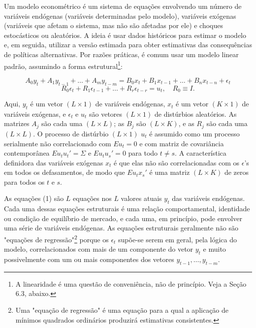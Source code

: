 \documentclass[12pt]{article}
\begin{document}
Um modelo econométrico é um sistema de equações envolvendo um número de variáveis endógenas (variáveis determinadas pelo modelo), variáveis exógenas (variáveis que afetam o sistema, mas não são afetadas por ele) e choques estocásticos ou aleatórios. A ideia é usar dados históricos para estimar o modelo e, em seguida, utilizar a versão estimada para obter estimativas das consequências de políticas alternativas. Por razões práticas, é comum usar um modelo linear padrão, assumindo a forma estrutural\footnote{A linearidade é uma questão de conveniência, não de princípio. Veja a Seção 6.3, abaixo.}:

\begin{equation}
A_0 y_t + A_1 y_{t-1} + \dots + A_m y_{t-m} = B_0 x_t + B_1 x_{t-1} + \dots + B_n x_{t-n} + \epsilon_t
\end{equation}
\begin{equation}
R_0 \epsilon_t + R_1 \epsilon_{t-1} + \dots + R_r \epsilon_{t-r} = u_t, \quad R_0 \equiv I.
\end{equation}

Aqui, $y_t$ é um vetor $(L \times 1)$ de variáveis endógenas, $x_t$ é um vetor $(K \times 1)$ de variáveis exógenas, e $\epsilon_t$ e $u_t$ são vetores $(L \times 1)$ de distúrbios aleatórios. As matrizes $A_j$ são cada uma $(L \times L)$; as $B_j$ são $(L \times K)$, e as $R_j$ são cada uma $(L \times L)$. O processo de distúrbio $(L \times 1)$ $u_t$ é assumido como um processo serialmente não correlacionado com $E u_t = 0$ e com matriz de covariância contemporânea $E u_t u_t' = \Sigma$ e $E u_t u_s' = 0$ para todo $t \neq s$. A característica definidora das variáveis exógenas $x_t$ é que elas não são correlacionadas com os $\epsilon$'s em todos os defasamentos, de modo que $E u_t x_s'$ é uma matriz $(L \times K)$ de zeros para todos os $t$ e $s$.

As equações (1) são $L$ equações nos $L$ valores atuais $y_t$ das variáveis endógenas. Cada uma dessas equações estruturais é uma relação comportamental, identidade ou condição de equilíbrio de mercado, e cada uma, em princípio, pode envolver uma série de variáveis endógenas. As equações estruturais geralmente não são "equações de regressão"\footnote{Uma "equação de regressão" é uma equação para a qual a aplicação de mínimos quadrados ordinários produzirá estimativas consistentes.} porque os $\epsilon_t$ supõe-se serem em geral, pela lógica do modelo, correlacionados com mais de um componente do vetor $y_t$ e muito possivelmente com um ou mais componentes dos vetores $y_{t-1}, \dots, y_{t-m}$.
\end{document}
